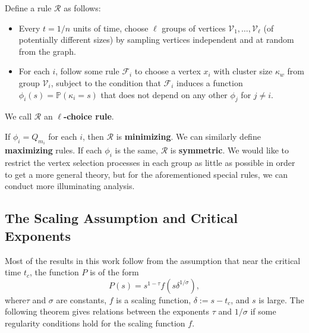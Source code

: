 \documentclass[twoside,10pt]{article}
\begin{document}
\begin{defn}[]
        Define a rule $\mathcal{R}$ as follows:
        \begin{itemize}
                \item Every $t=1/n$ units of time, choose $\ell$ groups of vertices $\mathcal{V}_1, \dots, \mathcal{V}_{\ell}$ (of potentially different sizes) by sampling vertices independent and at random from the graph.
                \item For each $i$, follow some rule $\mathcal{F}_{i}$ to choose a vertex $x_i$ with cluster size $\kappa_w$ from group $\mathcal{V}_i$, subject to the condition that $\mathcal{F}_i$ induces a function $\phi_i(s) = \mathbb{P}\left( \kappa_i=s \right) $ that does not depend on any other $\phi_j$ for $j \neq i$.
        \end{itemize}
We call $\mathcal{R}$ an \textbf{$\ell$-choice rule}.
\end{defn}

If $\phi_{i}=Q_{m_i}$ for each $i$, then $\mathcal{R}$ is \textbf{minimizing}. We can similarly define \textbf{maximizing} rules. If each $\phi_i$ is the same, $\mathcal{R}$ is \textbf{symmetric}. We would like to restrict the vertex selection processes in each group as little as possible in order to get a more general theory, but for the aforementioned special rules, we can conduct more illuminating analysis.

\subsection{The Scaling Assumption and Critical Exponents}


Most of the results in this work follow from the assumption that near the critical time $t_c$, the function $P$ is of the form
\begin{equation}
        P(s) = s^{1-\tau}f(s \delta^{1/\sigma}),
\end{equation}
where$\tau$ and $\sigma$ are constants, $f$ is a scaling function, $\delta:= s-t_{c}$, and $s$ is large. The following theorem gives relations between the exponents $\tau$ and $1/\sigma$ if some regularity conditions hold for the scaling function $f$.
\end{document}
